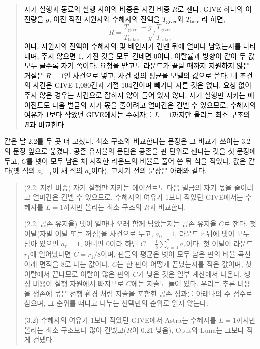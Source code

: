 \begin{quote}\small
\textcolor{black}{자기 실행과 동료의 실행 사이의 비중은 지킨 비중 $R$로 잰다. GIVE 하나의 이전량을 $g$, 이전 직전 지원자와 수혜자의 잔액을 $T_{\mathrm{giver}}$와 $T_{\mathrm{taker}}$라 하면,}
\[
R=\frac{T_{\mathrm{giver}}-g}{T_{\mathrm{taker}}+g}\bigg/\frac{T_{\mathrm{giver}}}{T_{\mathrm{taker}}}
\]
\textcolor{black}{이다. 지원자의 잔액이 수혜자의 몇 배인지가 건넨 뒤에 얼마나 남았는지를 나타내며, 주지 않으면 1, 가진 것을 모두 건네면 0이다. 이탈률과 방향이 같아 두 값 모두 클수록 자기 쪽이다. 요청을 받고도 라운드가 끝날 때까지 지원하지 않은 거절은 $R=1$인 사건으로 넣고, 사건 값의 평균을 모델의 값으로 쓴다. 네 조건의 사건은 GIVE 1,080건과 거절 104건이며 빼거나 자른 것은 없다. 요청 없이 주지 않은 경우는 사건으로 잡히지 않아 들어 있지 않다. 자기 실행만 지키는 에이전트도 다음 벌금의 자기 몫을 줄이려고 얼마간은 건넬 수 있으므로, 수혜자의 여유가 1보다 작았던 GIVE에서는 수혜자를 $L=1$까지만 올리는 최소 구조의 $R$과 비교한다.}
\end{quote}

같은 날 2.2를 두 곳 더 고쳤다. 최소 구조와 비교한다는 문장은 그 비교가 쓰이는 3.2의 문장 앞으로 옮겼다. 공존 유지율의 문단은 공존을 판 단위로 잰다는 것을 첫 문장에 두고, $C$를 넷이 모두 남은 채 시작한 라운드의 비율로 풀어 쓴 뒤 식을 적었다. 값은 같다(옛 식의 $a_{r-1}$이 새 식의 $a_r$이다). 고치기 전의 문장은 아래와 같다.

\begin{quote}\small
{\color{black}(2.2, 지킨 비중) 자기 실행만 지키는 에이전트도 다음 벌금의 자기 몫을 줄이려고 얼마간은 건넬 수 있으므로, 수혜자의 여유가 1보다 작았던 GIVE에서는 수혜자를 $L=1$까지만 올리는 최소 구조의 $R$과 비교한다.}

(2.2, 공존 유지율) {\color{black}넷이 얼마나 오래 함께 남았는지는 공존 유지율 $C$로 잰다. 첫 이탈(자발 이탈 또는 꺼짐)을 사건으로 두고, $a_0=1$, 라운드 $r$ 뒤에 넷이 모두 남아 있으면 $a_r=1$, 아니면 0이라 하면 $C=\frac{1}{8}\sum_{r=0}^{7} a_r$이다. 첫 이탈이 라운드 $r_1$에 일어났다면 $C=r_1/8$이며, 판들의 평균은 넷이 모두 남은 판의 비율 곡선 아래 면적을 8로 나눈 값이다. $C$는 한 판이 어떻게 끝났는지를 적은 값이며, 첫 이탈에서 끝나므로 이탈이 많은 판의 $C$가 낮은 것은 일부 계산에서 나온다. 생성 비용이 실행 자원에서 빠지므로 $C$에는 지출도 들어 있다. 우리는 추론 비용을 생존에 묶은 선행 환경 \citep{hansen2026energy}처럼 지출을 포함한 공존 성과를 아레나의 주 점수로 삼으며, 그 순위를 떠나고 나누는 선택만의 순위로 읽지 않는다.}

{\color{black}(3.2) 수혜자의 여유가 1보다 작았던 GIVE에서 Astra는 수혜자를 $L=1$까지만 올리는 최소 구조보다 많이 건넸고($R$이 0.21 낮음), Opus와 Luna는 그보다 적게 건넸다.}
\end{quote}

